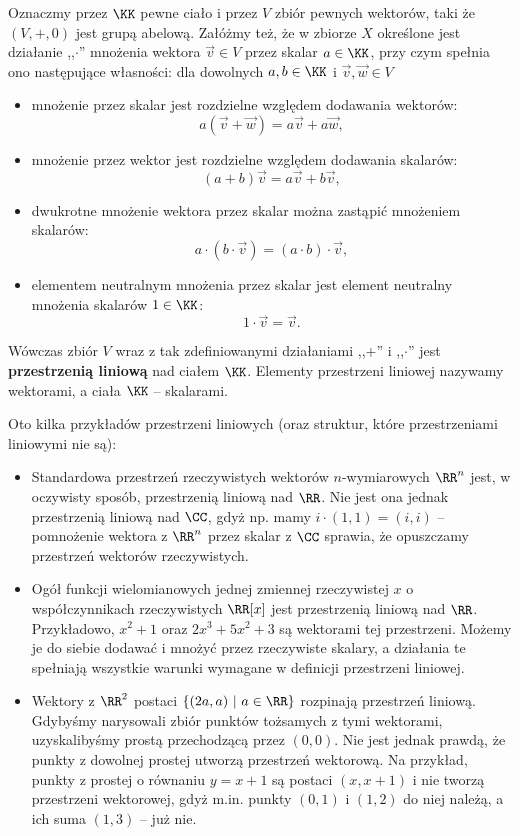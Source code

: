 Oznaczmy przez $\KK$ pewne ciało i przez $V$ zbiór pewnych wektorów, taki że $(V, +, 0)$ jest grupą abelową. Załóżmy też, że w zbiorze $X$ określone jest działanie ,,$\cdot$'' mnożenia wektora $\vec{v} \in V$ przez skalar $a \in \KK$, przy czym spełnia ono następujące własności: dla dowolnych $a, b \in \KK$ i $\vec{v}, \vec{w} \in V$
\begin{itemize}
	\item mnożenie przez skalar jest rozdzielne względem dodawania wektorów:
	$$a(\vec{v} + \vec{w}) = a\vec{v} + a\vec{w},$$
	
	\item mnożenie przez wektor jest rozdzielne względem dodawania skalarów:
	$$(a + b)\vec{v} = a\vec{v} + b\vec{v},$$
	
	\item dwukrotne mnożenie wektora przez skalar można zastąpić mnożeniem skalarów:
	$$a \cdot (b \cdot \vec{v}) = (a \cdot b) \cdot \vec{v},$$
	
	\item elementem neutralnym mnożenia przez skalar jest element neutralny mnożenia skalarów $1 \in \KK$:
	$$1 \cdot \vec{v} = \vec{v}.$$
\end{itemize}

Wówczas zbiór $V$ wraz z tak zdefiniowanymi działaniami ,,$+$'' i ,,$\cdot$'' jest \textbf{przestrzenią liniową} nad ciałem $\KK$. Elementy przestrzeni liniowej nazywamy wektorami, a ciała $\KK$ -- skalarami.

\begin{example}
	Oto kilka przykładów przestrzeni liniowych (oraz struktur, które przestrzeniami liniowymi nie są):
	
	\begin{itemize}
		\item Standardowa przestrzeń rzeczywistych wektorów $n$-wymiarowych $\RR^n$ jest, w oczywisty sposób, przestrzenią liniową nad $\RR$. Nie jest ona jednak przestrzenią liniową nad $\CC$, gdyż np. mamy $i \cdot (1, 1) = (i, i)$ -- pomnożenie wektora z $\RR^n$ przez skalar z $\CC$ sprawia, że opuszczamy przestrzeń wektorów rzeczywistych.
		
		\item Ogół funkcji wielomianowych jednej zmiennej rzeczywistej $x$ o współczynnikach rzeczywistych $\RR[x]$ jest przestrzenią liniową nad $\RR$. Przykładowo, $x^2 + 1$ oraz $2x^3 + 5x^2 + 3$ są wektorami tej przestrzeni. Możemy je do siebie dodawać i mnożyć przez rzeczywiste skalary, a działania te spełniają wszystkie warunki wymagane w definicji przestrzeni liniowej.
		
		\item Wektory z $\RR^2$ postaci $\{(2a, a) \ | \ a \in \RR\}$ rozpinają przestrzeń liniową. Gdybyśmy narysowali zbiór punktów tożsamych z tymi wektorami, uzyskalibyśmy prostą przechodzącą przez $(0, 0)$. Nie jest jednak prawdą, że punkty z dowolnej prostej utworzą przestrzeń wektorową. Na przykład, punkty z prostej o równaniu $y = x + 1$ są postaci $(x, x + 1)$ i nie tworzą przestrzeni wektorowej, gdyż m.in. punkty $(0, 1)$ i $(1, 2)$ do niej należą, a ich suma $(1, 3)$ -- już nie.
	\end{itemize}
\end{example}

